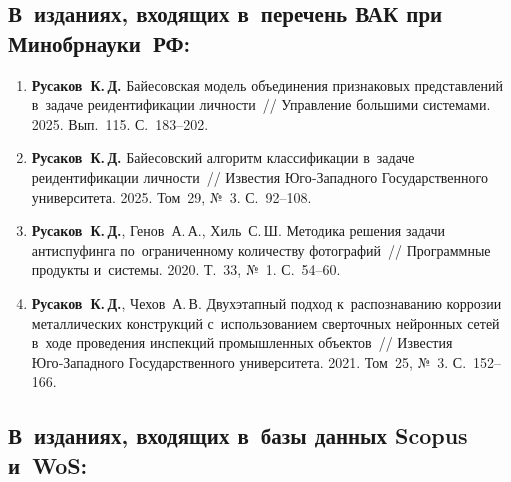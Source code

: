 \subsection*{В~изданиях, входящих в~перечень ВАК при Минобрнауки~РФ:}

\begin{enumerate}
    \item \textbf{Русаков~К.\,Д.} Байесовская модель объединения признаковых
          представлений в~задаче реидентификации личности~// Управление большими
          системами. 2025. Вып.~115. С.~183--202.
    \item \textbf{Русаков~К.\,Д.} Байесовский алгоритм классификации в~задаче
          реидентификации личности~// Известия Юго‑Западного Государственного
          университета. 2025. Том~29, №~3. С.~92--108.
    \item \textbf{Русаков~К.\,Д.}, Генов~А.\,А., Хиль~С.\,Ш. Методика решения
          задачи антиспуфинга по~ограниченному количеству фотографий~//
          Программные продукты и~системы. 2020. Т.~33, №~1. С.~54--60.
    \item \textbf{Русаков~К.\,Д.}, Чехов~А.\,В. Двухэтапный подход
          к~распознаванию коррозии металлических конструкций с~использованием
          сверточных нейронных сетей в~ходе проведения инспекций промышленных
          объектов~// Известия Юго‑Западного Государственного университета. 2021.
          Том~25, №~3. С.~152--166.
\end{enumerate}

\subsection*{В~изданиях, входящих в~базы данных Scopus и~WoS:}

